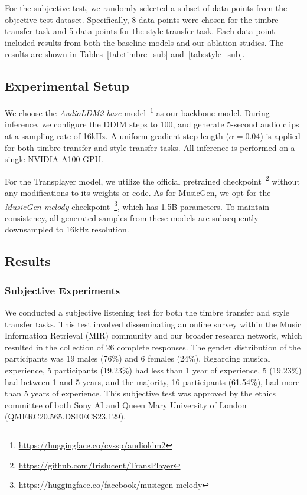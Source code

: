 For the subjective test, we randomly selected a subset of data points from the objective test dataset. Specifically, 8 data points were chosen for the timbre transfer task and 5 data points for the style transfer task. Each data point included results from both the baseline models and our ablation studies. The results are shown in Tables~\ref{tab:timbre_sub} and~\ref{tab:style_sub}. 

\subsection{Experimental Setup}

We choose the \textit{AudioLDM2-base} model~\footnote{\url{https://huggingface.co/cvssp/audioldm2}} as our backbone model. During inference, we configure the DDIM steps to 100, and generate 5-second audio clips at a sampling rate of 16kHz. A uniform gradient step length ($\alpha = 0.04$) is applied for both timbre transfer and style transfer tasks. All inference is performed on a single NVIDIA A100 GPU.

For the Transplayer model, we utilize the official pretrained checkpoint~\footnote{\url{https://github.com/Irislucent/TransPlayer}} without any modifications to its weights or code. As for MusicGen, we opt for the \textit{MusicGen-melody} checkpoint~\footnote{\url{https://huggingface.co/facebook/musicgen-melody}}, which has 1.5B parameters. To maintain consistency, all generated samples from these models are subsequently downsampled to 16kHz resolution.

\subsection{Results}

\subsubsection{Subjective Experiments}

We conducted a subjective listening test for both the timbre transfer and style transfer tasks. This test involved disseminating an online survey within the Music Information Retrieval (MIR) community and our broader research network, which resulted in the collection of 26 complete responses. The gender distribution of the participants was 19 males (76\%) and 6 females (24\%). Regarding musical experience, 5 participants (19.23\%) had less than 1 year of experience, 5 (19.23\%) had between 1 and 5 years, and the majority, 16 participants (61.54\%), had more than 5 years of experience. This subjective test was approved by the ethics committee of both Sony AI and Queen Mary University of London (QMERC20.565.DSEECS23.129).


